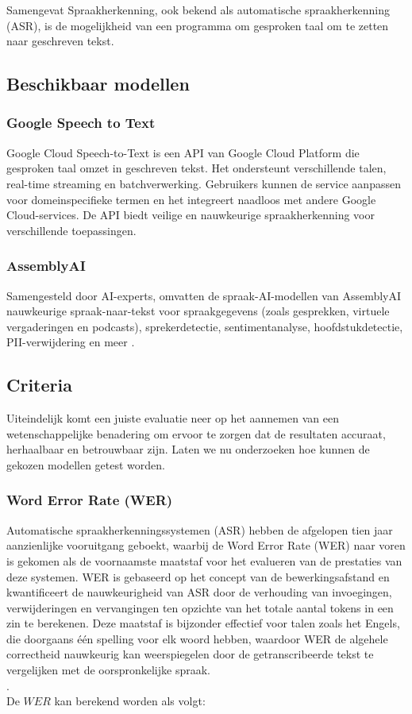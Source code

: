 Samengevat Spraakherkenning, ook bekend als automatische spraakherkenning (ASR), is de mogelijkheid van een programma om gesproken taal om te zetten naar geschreven tekst.

\subsection{Beschikbaar modellen}
\subsubsection{Google Speech to Text}

Google Cloud Speech-to-Text is een API van Google Cloud Platform die gesproken taal omzet in geschreven tekst. Het ondersteunt verschillende talen, real-time streaming en batchverwerking. Gebruikers kunnen de service aanpassen voor domeinspecifieke termen en het integreert naadloos met andere Google Cloud-services. De API biedt veilige en nauwkeurige spraakherkenning voor verschillende toepassingen.\autocite{DocsGoogle}
\subsubsection{AssemblyAI}
Samengesteld door AI-experts, omvatten de spraak-AI-modellen van AssemblyAI nauwkeurige spraak-naar-tekst voor spraakgegevens (zoals gesprekken, virtuele vergaderingen en podcasts), sprekerdetectie, sentimentanalyse, hoofdstukdetectie, PII-verwijdering en meer \autocite{DocsAssemblyai}.
\subsection{Criteria}
Uiteindelijk komt een juiste evaluatie neer op het aannemen van een wetenschappelijke benadering om ervoor te zorgen dat de resultaten accuraat, herhaalbaar en betrouwbaar zijn. Laten we nu onderzoeken hoe kunnen de gekozen modellen getest worden.

\subsubsection{Word Error Rate (WER)}
Automatische spraakherkenningssystemen (ASR) hebben de afgelopen tien jaar aanzienlijke vooruitgang geboekt, waarbij de Word Error Rate (WER) naar voren is gekomen als de voornaamste maatstaf voor het evalueren van de prestaties van deze systemen. WER is gebaseerd op het concept van de bewerkingsafstand en kwantificeert de nauwkeurigheid van ASR door de verhouding van invoegingen, verwijderingen en vervangingen ten opzichte van het totale aantal tokens in een zin te berekenen. Deze maatstaf is bijzonder effectief voor talen zoals het Engels, die doorgaans één spelling voor elk woord hebben, waardoor WER de algehele correctheid nauwkeurig kan weerspiegelen door de getranscribeerde tekst te vergelijken met de oorspronkelijke spraak.\\
\autocite{Raghavan2022}.
\\De \(WER\) kan berekend worden als volgt:


